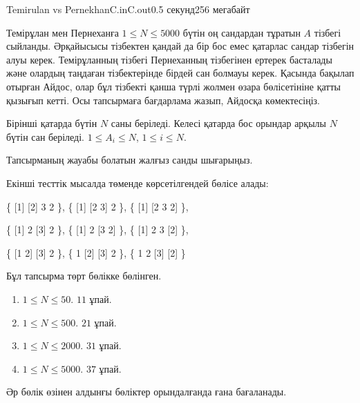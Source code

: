 \begin{problem}{Temirulan vs Pernekhan}{C.in}{C.out}{0.5 секунд}{256 мегабайт}

Темірұлан мен Пернеханға $1 \le N \le 5000$ бүтін оң сандардан тұратын $A$ тізбегі сыйланды. Әрқайысысы тізбектен қандай да бір бос емес қатарлас сандар тізбегін алуы керек. Темірұланның тізбегі Пернеханның тізбегінен ертерек басталады және олардың таңдаған тізбектерінде бірдей сан болмауы керек. Қасында бақылап отырған Айдос, олар бұл тізбекті қанша түрлі жолмен өзара бөлісетініне қатты қызығып кетті. Осы тапсырмаға бағдарлама жазып, Айдосқа көмектесіңіз.

\InputFile
Бірінші қатарда бүтін $N$ саны беріледі. Келесі қатарда бос орындар арқылы $N$ бүтін сан беріледі. $1 \le A_i \le N$, $1 \le i \le N$.

\OutputFile
Тапсырманың жауабы болатын жалғыз санды шығарыңыз.

\Examples

\begin{example}
%
%
%
\end{example}


Екінші тесттік мысалда төменде көрсетілгендей бөлісе алады:

\{ [1] [2] 3 2 \}, \{ [1] [2 3] 2 \}, \{ [1] [2 3 2] \},

\{ [1] 2 [3] 2 \}, \{ [1] 2 [3 2] \}, \{ [1] 2 3 [2] \}, 

\{ [1 2] [3] 2 \}, \{ 1 [2] [3] 2 \}, \{ 1 2 [3] [2] \}

\Scoring
Бұл тапсырма төрт бөлікке бөлінген.
\begin{enumerate}
\item $1 \le N \le 50$. $11$ ұпай.
\item $1 \le N \le 500$. $21$ ұпай.
\item $1 \le N \le 2000$. $31$ ұпай.
\item $1 \le N \le 5000$. $37$ ұпай.
\end{enumerate}

Әр бөлік өзінен алдынғы бөліктер орындалғанда ғана бағаланады.

\end{problem}
